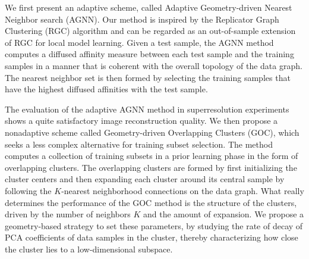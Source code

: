 \documentclass[journal]{IEEEtran}
\begin{document}
We first present an adaptive scheme, called Adaptive Geometry-driven Nearest Neighbor search (AGNN). Our method is inspired by the Replicator Graph Clustering (RGC) \cite{Donoser13replicator} algorithm and can be regarded as an out-of-sample extension of RGC for local model learning. Given a test sample, the AGNN method computes a diffused affinity measure between each test sample and the training samples in a manner that is coherent with the overall topology of the data graph. The nearest neighbor set is then formed by selecting the training samples that have the highest diffused affinities with the test sample.

The evaluation of the adaptive AGNN method in superresolution experiments 
shows a quite satisfactory image reconstruction quality. 
We then propose a nonadaptive scheme called Geometry-driven Overlapping Clusters (GOC), which seeks a less complex alternative for training subset selection. The method computes a collection of training subsets in a prior learning phase in the form of overlapping clusters. The overlapping clusters are formed by first initializing the cluster centers and then expanding each cluster around its central sample by following the $K$-nearest neighborhood connections on the data graph. What really determines the performance of the GOC method is the structure of the clusters, driven by the number of neighbors $K$ and the amount of expansion. We propose a geometry-based strategy to set these parameters, by studying the rate of decay of PCA coefficients of data samples in the cluster, thereby characterizing how close the cluster lies to a low-dimensional subspace.

\end{document}
